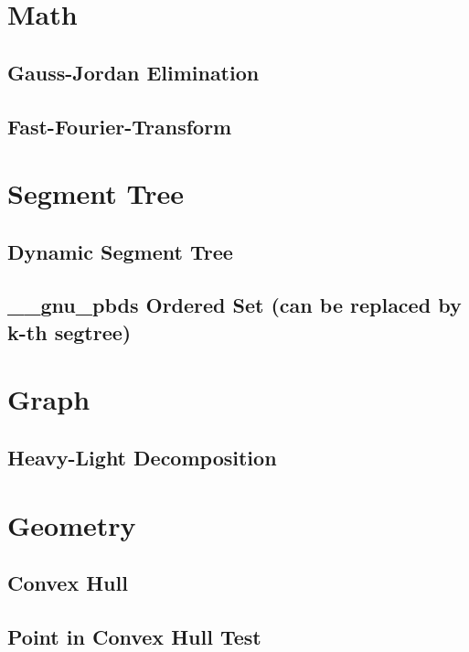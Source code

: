 \documentclass[10pt,landscape,a4paper,twocolumn]{article}
\begin{document}
\section{Math}

\subsection{Gauss-Jordan Elimination}


\subsection{Fast-Fourier-Transform}


\section{Segment Tree}

\subsection{Dynamic Segment Tree}


\subsection{\_\_gnu\_pbds Ordered Set (can be replaced by k-th segtree)}


\section{Graph}

\subsection{Heavy-Light Decomposition}


\section{Geometry}

\subsection{Convex Hull}


\subsection{Point in Convex Hull Test}

\end{document}
